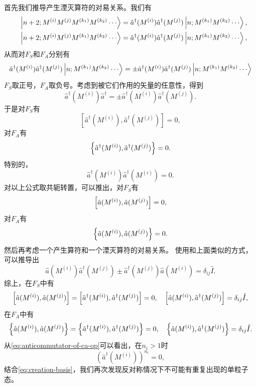 \documentclass[hyperref, UTF8, a4paper]{ctexart}
\begin{document}
首先我们推导产生湮灭算符的对易关系。我们有
\[
    \begin{split}
        \ket{n+2;M^{(i)}M^{(j)}M^{(k_1)}M^{(k_2)} \cdots} = \hat{a}^\dagger (M^{(i)}) \hat{a}^\dagger (M^{(j)}) \ket{n; M^{(k_1)}M^{(k_2)} \cdots}, \\ 
        \quad \ket{n+2;M^{(i)}M^{(j)}M^{(k_1)}M^{(k_2)} \cdots} = \hat{a}^\dagger (M^{(i)}) \hat{a}^\dagger (M^{(j)}) \ket{n; M^{(k_1)}M^{(k_2)} \cdots},
    \end{split}
\]
从而对$F_S$和$F_A$分别有
\[
    \hat{a}^\dagger (M^{(i)}) \hat{a}^\dagger (M^{(j)}) \ket{n; M^{(k_1)}M^{(k_2)} \cdots} = \pm \hat{a}^\dagger (M^{(i)}) \hat{a}^\dagger (M^{(j)}) \ket{n; M^{(k_1)}M^{(k_2)} \cdots}
\]
$F_S$取正号，$F_A$取负号。考虑到被它们作用的矢量的任意性，得到
\[
    \hat{a}^\dagger (M^{(i)}) \hat{a}^\dagger = \pm \hat{a}^\dagger (M^{(i)}) \hat{a}^\dagger (M^{(j)}).
\]
于是对$F_S$有
\[
    [\hat{a}^\dagger (M^{(i)}), \hat{a}^\dagger (M^{(j)})] = 0,
\]
对$F_A$有
\[
    \acomm{\hat{a}^\dagger (M^{(i)})}{\hat{a}^\dagger (M^{(j)})} = 0.
\]
特别的，
\[
    \hat{a}^\dagger (M^{(i)}) \hat{a}^\dagger (M^{(i)}) = 0.
\]
对以上公式取共轭转置，可以推出，对$F_S$有
\[
    \comm{\hat{a}(M^{(i)})}{\hat{a}(M^{(j)})} = 0,
\]
对$F_A$有
\[
    \acomm{\hat{a}(M^{(i)})}{\hat{a}(M^{(j)})} = 0.
\]
然后再考虑一个产生算符和一个湮灭算符的对易关系。
使用和上面类似的方式，可以推导出
\[
    \hat{a}(M^{(i)}) \hat{a}^\dagger (M^{(j)}) \pm \hat{a}^\dagger (M^{(j)}) \hat{a} (M^{(i)}) = \delta_{ij} \hat{I}.
\]
综上，在$F_S$中有
\begin{equation}
    \comm{\hat{a}(M^{(i)})}{\hat{a}(M^{(j)})} = \comm{\hat{a}^\dagger(M^{(i)})}{\hat{a}^\dagger(M^{(j)})} = 0, \quad \comm{\hat{a} (M^{(i)})}{\hat{a}^\dagger (M^{(j)})} = \delta_{ij} \hat{I},
    \label{eq:commutator-of-ca-op}
\end{equation}
在$F_A$中有
\begin{equation}
    \acomm{\hat{a}(M^{(i)})}{\hat{a}(M^{(j)})} = \acomm{\hat{a}^\dagger(M^{(i)})}{\hat{a}^\dagger(M^{(j)})} = 0, \quad \acomm{\hat{a} (M^{(i)})}{\hat{a}^\dagger (M^{(j)})} = \delta_{ij} \hat{I}.
    \label{eq:anticommutator-of-ca-op}
\end{equation}
从\eqref{eq:anticommutator-of-ca-op}可以看出，在$n_i > 1$时
\[
    \left( \hat{a}^\dagger (M^{(i)}) \right)^{n_i} = 0,
\]
结合\eqref{eq:creation-basis}，我们再次发现反对称情况下不可能有重复出现的单粒子态。
\end{document}
